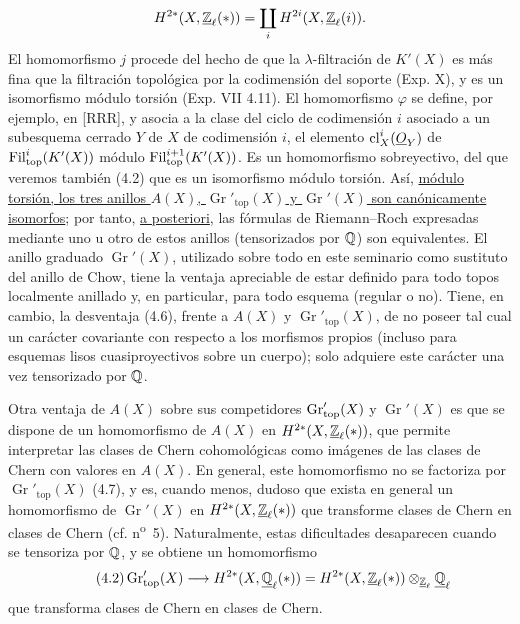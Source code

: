 \[
 H^{2*}(X,\underline{\mathbb Z}_\ell(*))=\coprod_i H^{2i}(X,\underline{\mathbb Z}_\ell(i)).
\]
El homomorfismo $j$ procede del hecho de que la $\lambda$-filtración de
$K'(X)$ es más fina que la filtración topológica por la codimensión del
soporte (Exp. X), y es un isomorfismo módulo torsión (Exp. VII 4.11). El
homomorfismo $\varphi$ se define, por ejemplo, en [RRR], y asocia a la clase
del ciclo de codimensión $i$ asociado a un subesquema cerrado $Y$ de $X$ de
codimensión $i$, el elemento $\operatorname{cl}_X^i(\underline O_Y)$ de
$\operatorname{Fil}_{\mathrm{top}}^i(K'(X))$ módulo $\operatorname{Fil}_{\mathrm{top}}^{i+1}(K'(X))$. Es un homomorfismo
sobreyectivo, del que veremos también (4.2) que es un isomorfismo módulo
torsión. Así, \uline{módulo torsión, los tres anillos $A(X)$,
$\operatorname{Gr}'_{\mathrm{top}}(X)$ y $\operatorname{Gr}'(X)$ son
canónicamente isomorfos}; por tanto, \uline{a posteriori}, las fórmulas de
Riemann--Roch expresadas mediante uno u otro de estos anillos (tensorizados
por $\mathbb Q$) son equivalentes. El anillo graduado $\operatorname{Gr}'(X)$,
utilizado sobre todo en este seminario como sustituto del anillo de Chow,
tiene la ventaja apreciable de estar definido para todo topos localmente
anillado y, en particular, para todo esquema (regular o no). Tiene, en cambio,
la desventaja (4.6), frente a $A(X)$ y
$\operatorname{Gr}'_{\mathrm{top}}(X)$, de no poseer tal cual un carácter
covariante con respecto a los morfismos propios (incluso para esquemas lisos
cuasiproyectivos sobre un cuerpo); solo adquiere este carácter una vez
tensorizado por $\mathbb Q$.

Otra ventaja de $A(X)$ sobre sus competidores
$\operatorname{Gr}'_{\mathrm{top}}(X)$ y $\operatorname{Gr}'(X)$ es que se %
dispone de un homomorfismo de $A(X)$ en
$H^{2*}(X,\underline{\mathbb Z}_\ell(*))$, que permite interpretar las clases de
Chern cohomológicas como imágenes de las clases de Chern con valores en
$A(X)$. En general, este homomorfismo no se factoriza por
$\operatorname{Gr}'_{\mathrm{top}}(X)$ (4.7), y es, cuando menos, dudoso que
exista en general un homomorfismo de $\operatorname{Gr}'(X)$ en
$H^{2*}(X,\underline{\mathbb Z}_\ell(*))$ que transforme clases de Chern en clases de
Chern (cf. n\textsuperscript{o}~5). Naturalmente, estas dificultades
desaparecen cuando se tensoriza por $\mathbb Q$, y se obtiene un homomorfismo
\begin{equation}\tag{4.2}
 \operatorname{Gr}'_{\mathrm{top}}(X)\longrightarrow H^{2*}(X,\underline{\mathbb Q}_\ell(*))=
 H^{2*}(X,\underline{\mathbb Z}_\ell(*))\otimes_{\underline{\mathbb Z}_\ell}\underline{\mathbb Q}_\ell
\end{equation}
que transforma clases de Chern en clases de Chern.

